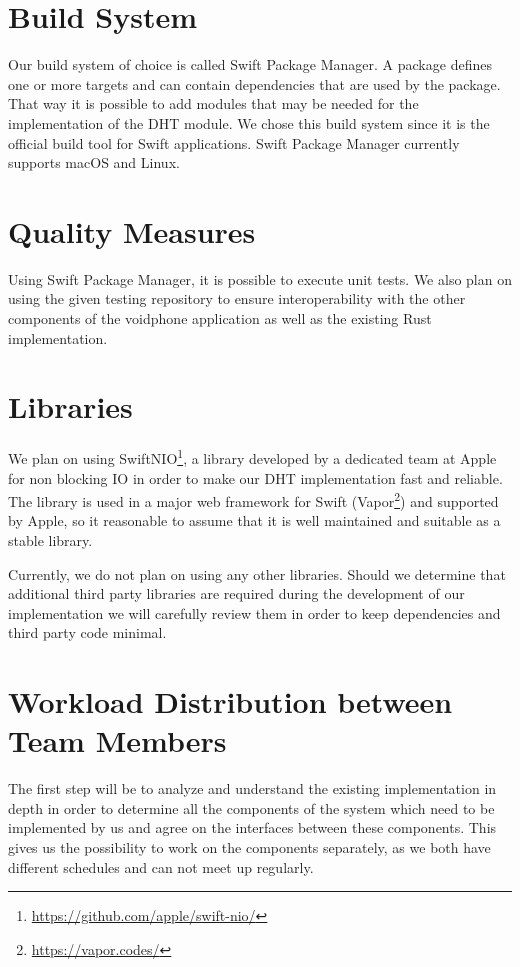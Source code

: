 \documentclass{article}
\begin{document}
\section{Build System}
Our build system of choice is called Swift Package Manager. A package defines one or more targets and can contain dependencies that are used by the package. That way it is possible to add modules that may be needed for the implementation of the DHT module.
We chose this build system since it is the official build tool for Swift applications. Swift Package Manager currently supports macOS and Linux.

\section{Quality Measures}

Using Swift Package Manager, it is possible to execute unit tests. We also plan on using the given testing repository to ensure interoperability with the other components of the voidphone application as well as the existing Rust implementation.

\section{Libraries}

We plan on using SwiftNIO\footnote{\url{https://github.com/apple/swift-nio/}}, a library developed by a dedicated team at Apple for non blocking IO in order to make our DHT implementation fast and reliable. The library is used in a major web framework for Swift (Vapor\footnote{\url{https://vapor.codes/}}) and supported by Apple, so it reasonable to assume that it is well maintained and suitable as a stable library.

Currently, we do not plan on using any other libraries. Should we determine that additional third party libraries are required during the development of our implementation we will carefully review them in order to keep dependencies and third party code minimal.

\section{Workload Distribution between Team Members}

The first step will be to analyze and understand the existing implementation in depth in order to determine all the components of the system which need to be implemented by us and agree on the interfaces between these components.
This gives us the possibility to work on the components separately, as we both have different schedules and can not meet up regularly.
\end{document}
